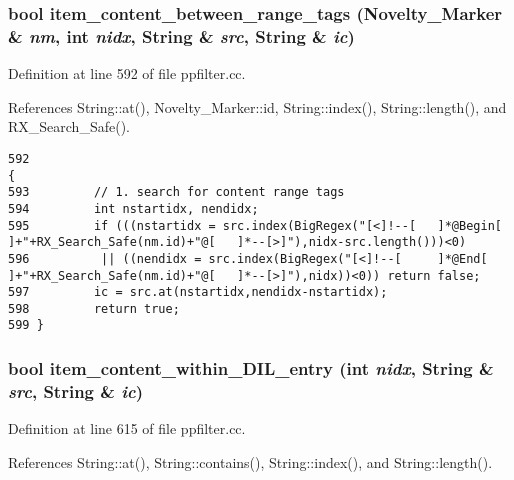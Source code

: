 \subsubsection{\setlength{\rightskip}{0pt plus 5cm}bool item\_\-content\_\-between\_\-range\_\-tags ({\bf Novelty\_\-Marker} \& {\em nm}, int {\em nidx}, {\bf String} \& {\em src}, {\bf String} \& {\em ic})}\label{ppfilter_8cc_a11}




Definition at line 592 of file ppfilter.cc.

References String::at(), Novelty\_\-Marker::id, String::index(), String::length(), and RX\_\-Search\_\-Safe().



\footnotesize\begin{verbatim}592                                                                                                {
593         // 1. search for content range tags
594         int nstartidx, nendidx;
595         if (((nstartidx = src.index(BigRegex("[<]!--[   ]*@Begin[       ]+"+RX_Search_Safe(nm.id)+"@[   ]*--[>]"),nidx-src.length()))<0)
596          || ((nendidx = src.index(BigRegex("[<]!--[     ]*@End[         ]+"+RX_Search_Safe(nm.id)+"@[   ]*--[>]"),nidx))<0)) return false;
597         ic = src.at(nstartidx,nendidx-nstartidx);
598         return true;
599 }
\end{verbatim}\normalsize 
{}
\subsubsection{\setlength{\rightskip}{0pt plus 5cm}bool item\_\-content\_\-within\_\-DIL\_\-entry (int {\em nidx}, {\bf String} \& {\em src}, {\bf String} \& {\em ic})}\label{ppfilter_8cc_a13}




Definition at line 615 of file ppfilter.cc.

References String::at(), String::contains(), String::index(), and String::length().



